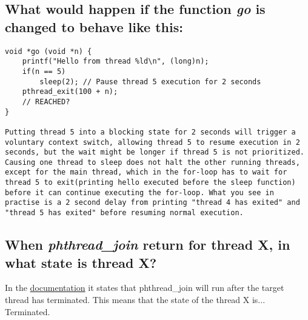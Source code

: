 \documentclass[a4paper]{article}
\begin{document}
\subsection{What would happen if the function \textit{go} is changed to behave like this:}

\begin{lstlisting}[style=CStyle]
void *go (void *n) {
    printf("Hello from thread %ld\n", (long)n);
    if(n == 5)
        sleep(2); // Pause thread 5 execution for 2 seconds
    pthread_exit(100 + n);
    // REACHED?
}

Putting thread 5 into a blocking state for 2 seconds will trigger a voluntary context switch, allowing thread 5 to resume execution in 2 seconds, but the wait might be longer if thread 5 is not prioritized. Causing one thread to sleep does not halt the other running threads, except for the main thread, which in the for-loop has to wait for thread 5 to exit(printing hello executed before the sleep function) before it can continue executing the for-loop. What you see in practise is a 2 second delay from printing "thread 4 has exited" and "thread 5 has exited" before resuming normal execution. 

\end{lstlisting}

\subsection{When {\it phthread\_join} return for thread X, in what state is thread X? }

In the \href{https://man7.org/linux/man-pages/man3/pthread_join.3.html}{documentation} it states that phthread\_join will run after the target thread has terminated. This means that the state of the thread X is... Terminated.
\end{document}
